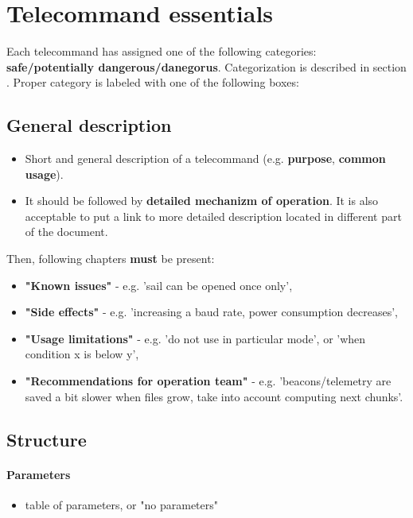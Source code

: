 \section{Telecommand essentials}

Each telecommand has assigned one of the following categories: \textbf{safe/potentially dangerous/danegorus}. Categorization is described in section . Proper category is labeled with one of the following boxes:


\subsection{General description}
\begin{itemize}
    \item Short and general description of a telecommand (e.g. \textbf{purpose}, \textbf{common usage}).
    \item It should be followed by \textbf{detailed mechanizm of operation}. It is also acceptable to put a link to more detailed description located in different part of the document.
\end{itemize}

Then, following chapters \textbf{must} be present:
\begin{itemize}
    \item \textbf{"Known issues"} - e.g. 'sail can be opened once only',
    \item \textbf{"Side effects"} - e.g. 'increasing a baud rate, power consumption decreases',
    \item \textbf{"Usage limitations"} - e.g. 'do not use in particular mode', or 'when condition x is below y',
    \item \textbf{"Recommendations for operation team"} - e.g. 'beacons/telemetry are saved a bit slower when files grow, take into account computing next chunks'.
\end{itemize}

\subsection{Structure}

\paragraph{Parameters}
    \begin{itemize}
    \item table of parameters, or "no parameters"
    \end{itemize}


